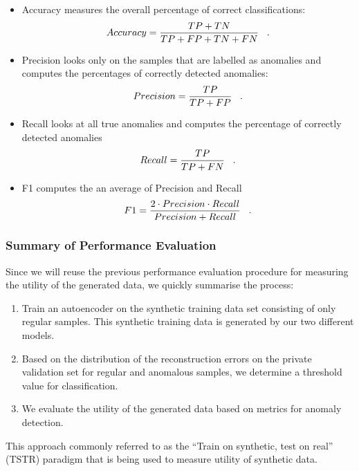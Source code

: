 \begin{itemize}
    \item Accuracy measures the overall percentage of correct classifications:
    \begin{align}
        Accuracy = \frac{TP+TN}{TP+FP+TN+FN} \;\;\;.
    \end{align}
    \item Precision looks only on the samples that are labelled as anomalies and computes the percentages of correctly detected anomalies:
    \begin{align}
        Precision = \frac{TP}{TP+FP} \;\;\;.
    \end{align}
    \item Recall looks at all true anomalies and computes the percentage of correctly detected anomalies
    \begin{align}
        Recall = \frac{TP}{TP+FN} \;\;\;.
    \end{align}
    \item F1 computes the an average of Precision and Recall
    \begin{align}
        F1 = \frac{2\cdot Precision\cdot Recall}{Precision + Recall} \;\;\;.
    \end{align}
\end{itemize}

\subsubsection*{Summary of Performance Evaluation}
Since we will reuse the previous performance evaluation procedure for measuring the utility of the generated data, we quickly summarise the process:
\begin{enumerate} \label{list:anom_eval}
    \item Train an autoencoder on the synthetic training data set consisting of only regular samples. This synthetic training data is generated by our two different models.
    \item Based on the distribution of the reconstruction errors on the private validation set for regular and anomalous samples, we determine a threshold value for classification.
    \item We evaluate the utility of the generated data based on metrics for anomaly detection.
\end{enumerate}

This approach commonly referred to as the ``Train on synthetic, test on real'' (TSTR) paradigm \parencite{esteban2017realvalued} that is being used to measure utility of synthetic data.

